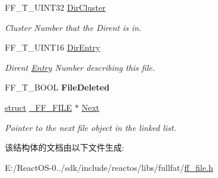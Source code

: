 \begin{DoxyCompactItemize}
\mbox{\label{struct___f_f___f_i_l_e_a025322ebd96ba4ce7d4ec4f447b11edd}} 
F\+F\+\_\+\+T\+\_\+\+U\+I\+N\+T32 \hyperlink{struct___f_f___f_i_l_e_a025322ebd96ba4ce7d4ec4f447b11edd}{Dir\+Cluster}
\begin{DoxyCompactList}\small\item\em Cluster Number that the Dirent is in. \end{DoxyCompactList}\item 
\mbox{\label{struct___f_f___f_i_l_e_afb99753f8de962cc1c633465849a9731}} 
F\+F\+\_\+\+T\+\_\+\+U\+I\+N\+T16 \hyperlink{struct___f_f___f_i_l_e_afb99753f8de962cc1c633465849a9731}{Dir\+Entry}
\begin{DoxyCompactList}\small\item\em Dirent \hyperlink{struct_entry}{Entry} Number describing this file. \end{DoxyCompactList}\item 
\mbox{\label{struct___f_f___f_i_l_e_ae3709f16fd42796b0c971e5558623929}} 
F\+F\+\_\+\+T\+\_\+\+B\+O\+OL {\bfseries File\+Deleted}
\item 
\mbox{\label{struct___f_f___f_i_l_e_afa4bc2ed7bb31d259ed66eb831af4298}} 
\hyperlink{interfacestruct}{struct} \hyperlink{struct___f_f___f_i_l_e}{\+\_\+\+F\+F\+\_\+\+F\+I\+LE} $\ast$ \hyperlink{struct___f_f___f_i_l_e_afa4bc2ed7bb31d259ed66eb831af4298}{Next}
\begin{DoxyCompactList}\small\item\em Pointer to the next file object in the linked list. \end{DoxyCompactList}\end{DoxyCompactItemize}


该结构体的文档由以下文件生成\+:\begin{DoxyCompactItemize}
\item 
E\+:/\+React\+O\+S-\/0../sdk/include/reactos/libs/fullfat/\hyperlink{ff__file_8h}{ff\+\_\+file.\+h}\end{DoxyCompactItemize}
